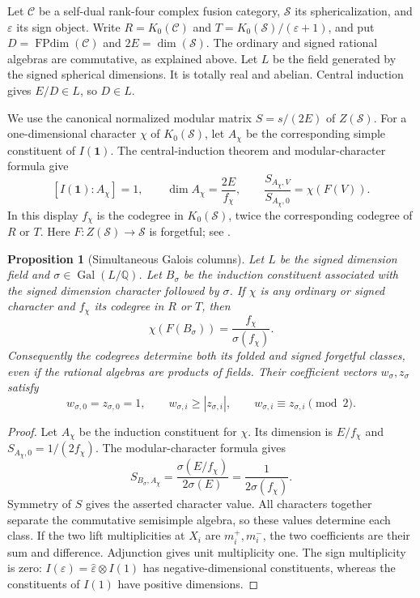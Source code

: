 \documentclass[11pt,a4paper]{article}
\newtheorem{proposition}[theorem]{Proposition}
\theoremstyle{definition}\newtheorem{definition}[theorem]{Definition}
\theoremstyle{remark}\newtheorem{remark}[theorem]{Remark}
\newcommand{\C}{\mathcal C}
\newcommand{\Q}{\mathbb Q}
\DeclareMathOperator{\Gal}{Gal}
\numberwithin{equation}{section}
\begin{document}
Let $\C$ be a self-dual rank-four complex fusion category,
$\mathcal S$ its sphericalization, and $\varepsilon$ its sign object.
Write $R=K_0(\C)$ and
$T=K_0(\mathcal S)/(\varepsilon+1)$, and put
$D=\operatorname{FPdim}(\C)$ and
$2E=\dim(\mathcal S)$. The ordinary and signed rational algebras
are commutative, as explained above. Let $L$ be the field generated
by the signed spherical dimensions. It is totally real and abelian.
Central induction gives $E/D\in L$, so $D\in L$.

We use the canonical normalized modular matrix
$S=s/(2E)$ of $Z(\mathcal S)$. For a one-dimensional character
$\chi$ of $K_0(\mathcal S)$, let $A_\chi$ be the corresponding
simple constituent of $I(\mathbf1)$. The central-induction theorem
and modular-character formula give
\begin{equation}\label{col:eq:central-column-character}
 [I(\mathbf1):A_\chi]=1,\qquad
 \dim A_\chi=\frac{2E}{f_\chi},\qquad
 \frac{S_{A_\chi,V}}{S_{A_\chi,0}}=\chi(F(V)).
\end{equation}
In this display $f_\chi$ is the codegree in $K_0(\mathcal S)$,
twice the corresponding codegree of $R$ or $T$.
Here $F:Z(\mathcal S)\to\mathcal S$ is forgetful; see
\cite[Example~2.9 and Theorem~2.13]{Ostrik3}.

\begin{proposition}[Simultaneous Galois columns]\label{col:prop:simultaneous-columns}
Let $L$ be the signed dimension field and $\sigma\in\Gal(L/\Q)$.
Let $B_\sigma$ be the induction constituent associated with the signed
dimension character followed by $\sigma$. If $\chi$ is any ordinary
or signed character and $f_\chi$ its codegree in $R$ or $T$, then
\[
\chi(F(B_\sigma))=\frac{f_\chi}{\sigma(f_\chi)}.
\]
Consequently the codegrees determine both its folded and signed
forgetful classes, even if the rational algebras are products of fields.
Their coefficient vectors $w_\sigma,z_\sigma$ satisfy
\[
w_{\sigma,0}=z_{\sigma,0}=1,\qquad
w_{\sigma,i}\ge |z_{\sigma,i}|,\qquad
w_{\sigma,i}\equiv z_{\sigma,i}\pmod2.
\]
\end{proposition}
\begin{proof}
Let $A_\chi$ be the induction constituent for $\chi$. Its dimension
is $E/f_\chi$ and $S_{A_\chi,0}=1/(2f_\chi)$. The modular-character
formula gives
\[
S_{B_\sigma,A_\chi}
=\frac{\sigma(E/f_\chi)}{2\sigma(E)}
=\frac1{2\sigma(f_\chi)}.
\]
Symmetry of $S$ gives the asserted character value. All characters
together separate the commutative semisimple algebra, so these values
determine each class. If the two lift multiplicities at $X_i$ are
$m_i^+,m_i^-$, the two coefficients are their sum and difference.
Adjunction gives unit multiplicity one. The sign multiplicity is zero:
$I(\varepsilon)=\widehat\varepsilon\otimes I(1)$ has negative-dimensional
constituents, whereas the constituents of $I(1)$ have positive dimensions.
\end{proof}
\end{document}
